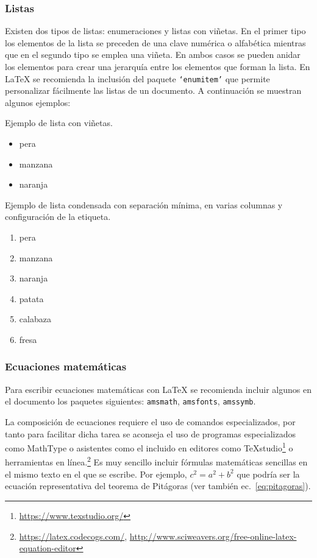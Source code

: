 \subsubsection{Listas}
\label{sec:ejListas}
Existen dos tipos de listas: enumeraciones y listas con viñetas. En el primer tipo los elementos de la lista se preceden de una clave numérica o alfabética mientras que en el segundo tipo se emplea una viñeta. En ambos casos se pueden anidar los elementos para crear una jerarquía entre los elementos que forman la lista. En \LaTeX{} se recomienda la inclusión del paquete \texttt{`enumitem'} que permite personalizar fácilmente las listas de un documento. A continuación se muestran algunos ejemplos:


\noindent Ejemplo de lista con viñetas. 
\begin{itemize}
	\item pera
	\item[\ding{43}] manzana %
	\item naranja
\end{itemize}


\noindent Ejemplo de lista condensada con separación mínima, en varias columnas y configuración de la etiqueta.
\begin{multicols}{2} %
	\begin{enumerate}[(1),nosep]
		\item pera
		\item manzana
		\item naranja
		\item patata
		\item calabaza
		\item fresa
	\end{enumerate}
\end{multicols}





\subsubsection{Ecuaciones matemáticas}
Para escribir ecuaciones matemáticas con \LaTeX{} se recomienda incluir algunos en el documento los paquetes siguientes: \texttt{amsmath}, \texttt{amsfonts}, \texttt{amssymb}. 

La composición de ecuaciones requiere el uso de comandos especializados, por tanto para facilitar dicha tarea se aconseja el uso de programas especializados como \textsf{MathType} o asistentes como el incluido en editores como \TeX studio\footnote{\url{https://www.texstudio.org/}} o herramientas en línea.\footnote{\url{https://latex.codecogs.com/},  \url{http://www.sciweavers.org/free-online-latex-equation-editor}} Es muy sencillo incluir fórmulas matemáticas sencillas en el mismo texto en el que se escribe. Por ejemplo, $c^{2}=a^{2}+b^{2}$ que podría ser la ecuación representativa del teorema de Pitágoras (ver también ec.~\ref{eq:pitagoras}).


